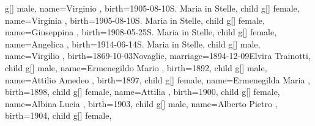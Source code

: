 \documentclass{article}
\begin{document}
\begin{midpage}
\begin{center}
\begin{genealogypicture}
{{{{{                    g[]{
                        male,
                        name={Virginio },
                        birth={1905-08-10}{S. Maria in Stelle},
                    }
                }
                child{
                    g[]{
                        female,
                        name={Virginia },
                        birth={1905-08-10}{S. Maria in Stelle},
                    }
                }
                child{
                    g[]{
                        female,
                        name={Giuseppina },
                        birth={1908-05-25}{S. Maria in Stelle},
                    }
                }
                child{
                    g[]{
                        female,
                        name={Angelica },
                        birth={1914-06-14}{S. Maria in Stelle},
                    }
                }
            }
            child{
                g[]{
                    male,
                    name={Virgilio },
                    birth={1869-10-03}{Novaglie},
                    marriage={1894-12-09}{Elvira Trainotti},
                }
                child{
                    g[]{
                        male,
                        name={Ermenegildo Mario },
                        birth={1892}{},
                    }
                }
                child{
                    g[]{
                        male,
                        name={Attilio Amedeo },
                        birth={1897}{},
                    }
                }
                child{
                    g[]{
                        female,
                        name={Ermenegilda Maria },
                        birth={1898}{},
                    }
                }
                child{
                    g[]{
                        female,
                        name={Attilia },
                        birth={1900}{},
                    }
                }
                child{
                    g[]{
                        female,
                        name={Albina Lucia },
                        birth={1903}{},
                    }
                }
                child{
                    g[]{
                        male,
                        name={Alberto Pietro },
                        birth={1904}{},
                    }
                }
                child{
                    g[]{
                        female,
}}}}}}
\end{genealogypicture}
\end{center}
\end{midpage}
\end{document}
